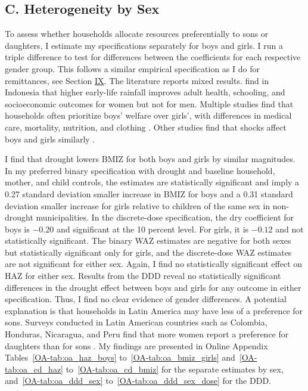\subsection*{C. Heterogeneity by Sex}

To assess whether households allocate resources preferentially to sons or daughters, I estimate my specifications separately for boys and girls. I run a triple difference to test for differences between the coefficients for each respective gender group. This follows a similar empirical specification as I do for remittances, see Section \hyperref[sec:IX]{IX}. The literature reports mixed results. \textcite{macciniWeatherHealthSchooling2009} find in Indonesia that higher early-life rainfall improves adult health, schooling, and socioeconomic outcomes for women but not for men. Multiple studies find that households often prioritize boys' welfare over girls', with differences in medical care, mortality, nutrition, and clothing \parencite{dasguptaSelectiveDiscriminationFemale1987,behrmanIntrahouseholdAllocationNutrients1988,behrmanIntrahouseholdDemandNutrients1990,roseConsumptionSmoothingExcess1999,aldermanFamilyResourcesGender1997}. Other studies find that shocks affect boys and girls similarly \parencite{levineGenderBiasIndonesian2003}.

I find that drought lowers BMIZ for both boys and girls by similar magnitudes. In my preferred binary specification with drought and baseline household, mother, and child controls, the estimates are statistically significant and imply a 0.27 standard deviation smaller increase in BMIZ for boys and a 0.31 standard deviation smaller increase for girls relative to children of the same sex in non-drought municipalities. In the discrete-dose specification, the dry coefficient for boys is $-0.20$ and significant at the 10 percent level. For girls, it is $-0.12$ and not statistically significant. The binary WAZ estimates are negative for both sexes but statistically significant only for girls, and the discrete-dose WAZ estimates are not significant for either sex. Again, I find no statistically significant effect on HAZ for either sex. Results from the DDD reveal no statistically significant differences in the drought effect between boys and girls for any outcome in either specification. Thus, I find no clear evidence of gender differences. A potential explanation is that households in Latin America may have less of a preference for sons. Surveys conducted in Latin American countries such as Colombia, Honduras, Nicaragua, and Peru find that more women report a preference for daughters than for sons \parencite{fuseVariationsAttitudinalGender2010}. My findings are presented in Online Appendix Tables~\ref{OA-tab:oa_haz_boys} to~\ref{OA-tab:oa_bmiz_girls} and~\ref{OA-tab:oa_cd_haz} to~\ref{OA-tab:oa_cd_bmiz} for the separate estimates by sex, and~\ref{OA-tab:oa_ddd_sex} to~\ref{OA-tab:oa_ddd_sex_dose} for the DDD.

